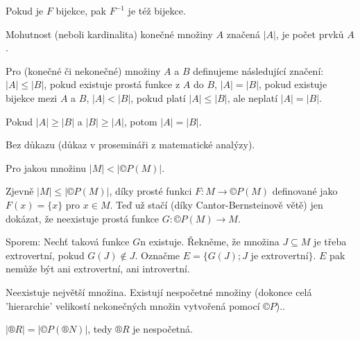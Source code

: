 \documentclass[12pt]{article}					%
\begin{document}
    \begin{dusledek}
        Pokud je $F$ bijekce, pak $F^{-1}$ je též bijekce.
    \end{dusledek}

    \begin{definice}
        Mohutnost (neboli kardinalita) konečné množiny $A$ značená $|A|$, je počet prvků $A$.

        Pro (konečné či nekonečné) množiny $A$ a $B$ definujeme následující značení: $|A| ≤ |B|$, pokud existuje prostá funkce z $A$ do $B$, $|A| = |B|$, pokud existuje bijekce mezi $A$ a $B$, $|A| < |B|$, pokud platí $|A| ≤ |B|$, ale neplatí $|A| = |B|$.
    \end{definice}

    \begin{veta}
        Pokud $|A| ≥ |B|$ a $|B| ≥ |A|$, potom $|A| = |B|$.

        \begin{dukazin}
            Bez důkazu (důkaz v prosemináři z matematické analýzy).
        \end{dukazin}
    \end{veta}

    \begin{veta}[Cantor, 1891]
        Pro jakou množinu $|M| < |©P(M)|$.

        \begin{dukazin}
            Zjevně $|M|≤ |©P(M)|$, díky prosté funkci $F: M \rightarrow ©P(M)$ definované jako $F(x) = \{x\}$ pro $x \in M$. Teď už stačí (díky Cantor-Bernsteinově větě) jen dokázat, že neexistuje prostá funkce $G: ©P(M)\rightarrow M$.

            Sporem: Nechť taková funkce $G$n existuje. Řekněme, že množina $J \subseteq M$ je třeba extrovertní, pokud $G(J) \notin J$. Označme $E = \{G(J); J \text{ je extrovertní}\}$. $E$ pak nemůže být ani extrovertní, ani introvertní.
        \end{dukazin}
    \end{veta}

    \begin{dusledek}
        Neexistuje největší množina. Existují nespočetné množiny (dokonce celá 'hierarchie' velikostí nekonečných množin vytvořená pomocí $©P$)..
    \end{dusledek}

    \begin{poznamka}
        $|®R| = |©P(®N)|$, tedy $®R$ je nespočetná.
    \end{poznamka}
\end{document}
